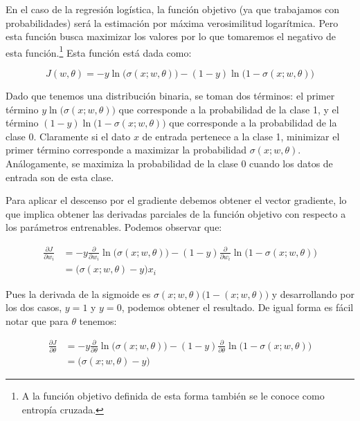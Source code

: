 En el caso de la regresión logística, la función objetivo (ya que trabajamos con probabilidades) será la estimación por máxima verosimilitud logarítmica. Pero esta función busca maximizar los valores por lo que tomaremos el negativo de esta función.\footnote{A la función objetivo definida de esta forma también se le conoce como entropía cruzada.} Esta función está dada como:

\begin{equation*}
    J(w, \theta) = - y \ln\big( \sigma(x; w, \theta)\big) - (1- y) \ln\big( 1-\sigma(x; w, \theta) \big)
\end{equation*}

Dado que tenemos una distribución binaria, se toman dos términos: el primer término $y \ln\big( \sigma(x; w, \theta)\big)$ que corresponde a la probabilidad de la clase 1, y el término $(1-y) \ln\big( 1-\sigma(x; w, \theta)\big)$ que corresponde a la probabilidad de la clase 0. Claramente si el dato $x$ de entrada pertenece a la clase 1, minimizar el primer término corresponde a maximizar la probabilidad $\sigma(x; w, \theta)$. Análogamente, se maximiza la probabilidad de la clase 0 cuando los datos de entrada son de esta clase.

Para aplicar el descenso por el gradiente debemos obtener el vector gradiente, lo que implica obtener las derivadas parciales de la función objetivo con respecto a los parámetros entrenables. Podemos observar que:

\begin{align*}
    \frac{\partial J }{\partial w_i} &= - y \frac{\partial}{\partial w_i} \ln\big( \sigma(x; w, \theta)\big) - (1- y) \frac{\partial }{\partial w_i}  \ln\big( 1-\sigma(x; w, \theta) \big) \\
        &= \big( \sigma(x; w, \theta) - y \big) x_i 
\end{align*}

Pues la derivada de la sigmoide es $\sigma(x; w, \theta)\big(1-(x; w, \theta)\big)$ y desarrollando por los dos casos, $y=1$ y $y=0$, podemos obtener el resultado. De igual forma es fácil notar que para $\theta$ tenemos:

\begin{align*}
    \frac{\partial J }{\partial \theta} &= - y \frac{\partial}{\partial \theta} \ln\big( \sigma(x; w, \theta)\big) - (1- y) \frac{\partial }{\partial \theta}  \ln\big( 1-\sigma(x; w, \theta) \big) \\
        &= \big( \sigma(x; w, \theta) - y \big)
\end{align*}

